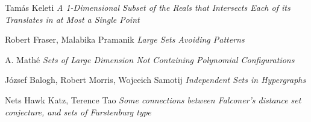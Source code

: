 \documentclass{article}
\theoremstyle{plain}
\theoremstyle{plain}
\begin{document}
\begin{thebibliography}{9}


Tam\'{a}s Keleti
\textit{A 1-Dimensional Subset of the Reals that Intersects Each of its Translates in at Most a Single Point}

Robert Fraser, Malabika Pramanik
\textit{Large Sets Avoiding Patterns}

A. Math\'{e}
\textit{Sets of Large Dimension Not Containing Polynomial Configurations}

J\'{o}zsef Balogh, Robert Morris, Wojceich Samotij
\textit{Independent Sets in Hypergraphs}




Nets Hawk Katz, Terence Tao
\textit{Some connections between Falconer's distance set conjecture, and sets of Furstenburg type}

\end{thebibliography}

\end{document}
